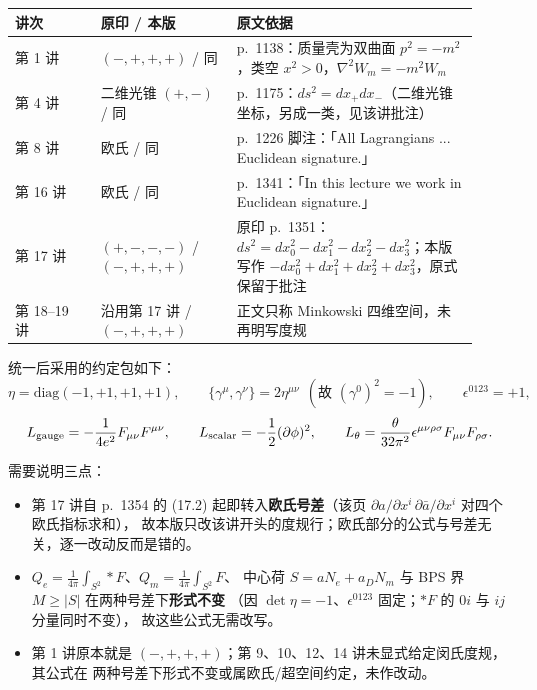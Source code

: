 \documentclass[11pt,a4paper]{article}
\theoremstyle{remark}
\theoremstyle{definition}
\theoremstyle{plain}
\begin{document}
\begin{center}
\small
\begin{tabular}{@{}p{0.17\linewidth}p{0.27\linewidth}p{0.48\linewidth}@{}}
\toprule
讲次 & 原印 / 本版 & 原文依据 \\
\midrule
第 1 讲 & $(-,+,+,+)$ / 同 & p.~1138：质量壳为双曲面 $p^2=-m^2$，类空 $x^2>0$，$\nabla^2W_m=-m^2W_m$ \\
第 4 讲 & 二维光锥 $(+,-)$ / 同 & p.~1175：$ds^2=dx_+dx_-$（二维光锥坐标，另成一类，见该讲批注） \\
第 8 讲 & 欧氏 / 同 & p.~1226 脚注：「All Lagrangians ... Euclidean signature.」 \\
第 16 讲 & 欧氏 / 同 & p.~1341：「In this lecture we work in Euclidean signature.」 \\
第 17 讲 & $(+,-,-,-)$ / $\mathbf{(-,+,+,+)}$ & 原印 p.~1351：$ds^2=dx_0^2-dx_1^2-dx_2^2-dx_3^2$；本版写作 $-dx_0^2+dx_1^2+dx_2^2+dx_3^2$，原式保留于批注 \\
第 18--19 讲 & 沿用第 17 讲 / $\mathbf{(-,+,+,+)}$ & 正文只称 Minkowski 四维空间，未再明写度规 \\
\bottomrule
\end{tabular}
\end{center}

统一后采用的约定包如下：
\[
\eta=\mathrm{diag}(-1,+1,+1,+1),\qquad
\{\gamma^\mu,\gamma^\nu\}=2\eta^{\mu\nu}\ \ (\text{故 }(\gamma^0)^2=-1),\qquad
\epsilon^{0123}=+1,
\]
\[
L_{\rm gauge}=-\frac{1}{4e^2}F_{\mu\nu}F^{\mu\nu},\qquad
L_{\rm scalar}=-\frac12(\partial\phi)^2,\qquad
L_\theta=\frac{\theta}{32\pi^2}\epsilon^{\mu\nu\rho\sigma}F_{\mu\nu}F_{\rho\sigma}.
\]

需要说明三点：
\begin{itemize}
  \item 第 17 讲自 p.~1354 的 (17.2) 起即转入\textbf{欧氏号差}（该页
        $\partial a/\partial x^i\,\partial\bar a/\partial x^i$ 对四个欧氏指标求和），
        故本版只改该讲开头的度规行；欧氏部分的公式与号差无关，逐一改动反而是错的。
  \item $Q_e=\frac{1}{4\pi}\int_{S^2}\ast F$、$Q_m=\frac{1}{4\pi}\int_{S^2}F$、
        中心荷 $S=aN_e+a_DN_m$ 与 BPS 界 $M\ge|S|$ 在两种号差下\textbf{形式不变}
        （因 $\det\eta=-1$、$\epsilon^{0123}$ 固定；$\ast F$ 的 $0i$ 与 $ij$ 分量同时不变），
        故这些公式无需改写。
  \item 第 1 讲原本就是 $(-,+,+,+)$；第 9、10、12、14 讲未显式给定闵氏度规，其公式在
        两种号差下形式不变或属欧氏/超空间约定，未作改动。
\end{itemize}
\end{document}
